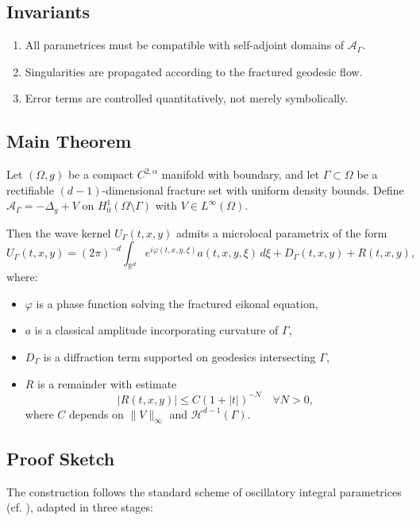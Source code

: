 \subsection*{Invariants}
\begin{enumerate}[label=I\arabic*]
  \item All parametrices must be compatible with self-adjoint domains of 
  $\mathcal{A}_\Gamma$.
  \item Singularities are propagated according to the fractured geodesic flow.
  \item Error terms are controlled quantitatively, not merely symbolically.
\end{enumerate}

\subsection*{Main Theorem}
\begin{theorem}
\label{thm:parametrix}
Let $(\Omega,g)$ be a compact $C^{2,\alpha}$ manifold with boundary, and let 
$\Gamma \subset \Omega$ be a rectifiable $(d-1)$-dimensional fracture set with 
uniform density bounds. Define $\mathcal{A}_\Gamma = -\Delta_g + V$ on 
$H^1_0(\Omega\setminus\Gamma)$ with $V \in L^\infty(\Omega)$.

Then the wave kernel $U_\Gamma(t,x,y)$ admits a microlocal parametrix of the form
\[
U_\Gamma(t,x,y) = (2\pi)^{-d} \int_{\mathbb{R}^d} e^{i\varphi(t,x,y,\xi)} 
a(t,x,y,\xi) \, d\xi + D_\Gamma(t,x,y) + R(t,x,y),
\]
where:
\begin{itemize}
  \item $\varphi$ is a phase function solving the fractured eikonal equation,
  \item $a$ is a classical amplitude incorporating curvature of $\Gamma$,
  \item $D_\Gamma$ is a diffraction term supported on geodesics intersecting $\Gamma$,
  \item $R$ is a remainder with estimate
  \[
  |R(t,x,y)| \leq C (1+|t|)^{-N} \quad \forall N>0,
  \]
  where $C$ depends on $\|V\|_\infty$ and $\mathcal{H}^{d-1}(\Gamma)$.
\end{itemize}
\end{theorem}

\subsection*{Proof Sketch}
The construction follows the standard scheme of oscillatory integral 
parametrices (cf. \cite{Hormander1985}), adapted in three stages:

